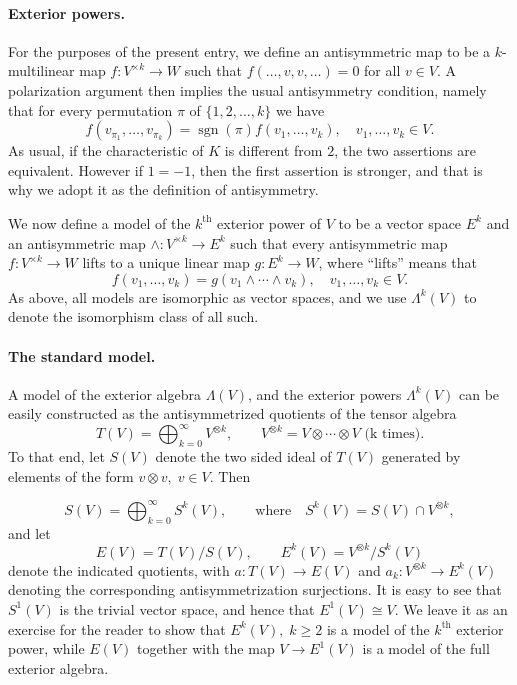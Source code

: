 \documentclass[12pt]{article}
\newcommand{\sgn}{\operatorname{sgn}}
\newcommand{\supth}{^{\text{th}}}
\begin{document}
\paragraph{Exterior powers.}
For the purposes of the present entry, we define an antisymmetric map
to be a $k$-multilinear map $f:V^{\times k}\to W$ such that $f(\dots,
v,v,\dots)=0$ for all $v\in V$. A polarization argument then implies the
usual antisymmetry condition, namely that for every permutation $\pi$
of $\{ 1,2,\dots, k\}$ we have
\[f(v_{\pi_1},\dots, v_{\pi_k}) = \sgn(\pi) f(v_1,\dots, v_k),\quad
v_1,\dots,v_k \in V.\]
As usual, if the characteristic of $K$ is different from $2$, the two
assertions are equivalent.  However if $1=-1$, then the first
assertion is stronger, and that is why we adopt it as the definition
of antisymmetry.

We now define a model of the $k\supth$ exterior power of $V$ to be a
vector space $E^k$ and an antisymmetric map $\wedge: V^{\times k}\to E^k$ such that every antisymmetric map $f:V^{\times
  k}\to W$ lifts to a unique linear map $g:E^k\to W$, where ``lifts''
means that \[f(v_1,\dots,v_k) = g(v_1\wedge\cdots\wedge v_k),\quad
v_1,\dots,v_k\in V.\]
As above, all models are isomorphic as vector spaces, and we use
$\Lambda^k(V)$ to denote the isomorphism class of all such.


\paragraph{The standard model.}  
A model of the exterior algebra
$\Lambda(V)$, and the exterior powers $\Lambda^k(V)$ can be easily
constructed as the antisymmetrized quotients of the tensor algebra
\[T(V)=\bigoplus_{k=0}^\infty V^{\otimes k},\qquad V^{\otimes k} =
V\otimes\cdots\otimes V \text{ (k times)}.\] To that end, let $S(V)$
denote the two sided ideal of $T(V)$ generated by
elements of the form $v\otimes v,\; v\in V$. Then

\[S(V)=\bigoplus_{k=0}^\infty S^k(V),\qquad  \textrm{where} \quad S^k(V)=S(V)\cap
V^{\otimes k},\]  and let 
\[ E(V)=T(V)/S(V),\qquad E^k(V)=V^{\otimes k}/S^k(V)\] denote the
indicated quotients, with $a:T(V)\to E(V)$ and $a_k: V^{\otimes k} \to
E^k(V)$ denoting the corresponding antisymmetrization surjections.  It
is easy to see that $S^1(V)$ is the trivial vector space, and hence
that $E^1(V) \cong V$.  We leave it as an exercise for the reader to
show that $E^k(V),\; k\geq 2$ is a model of the $k\supth$ exterior
power, while $E(V)$ together with the map $V\to E^1(V)$ is a model of
the full exterior algebra.
\end{document}
